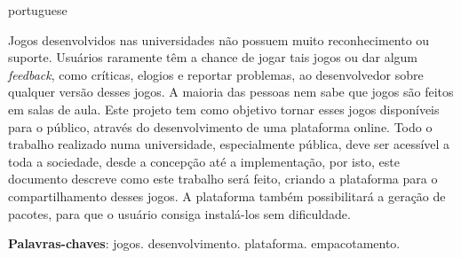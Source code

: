\begin{resumo}[Resumo]
 \begin{otherlanguage*}{portuguese}

Jogos desenvolvidos nas universidades não possuem muito reconhecimento ou suporte. Usuários raramente têm a chance de jogar tais jogos ou dar algum \textit{feedback}, como críticas, elogios e reportar problemas, ao desenvolvedor sobre qualquer versão desses jogos. A maioria das pessoas nem sabe que jogos são feitos em salas de aula. Este projeto tem como objetivo tornar esses jogos disponíveis para o público, através do desenvolvimento de uma plataforma online. Todo o trabalho realizado numa universidade, especialmente pública, deve ser acessível a toda a sociedade, desde a concepção até a implementação, por isto, este documento descreve como este trabalho será feito, criando a plataforma para o compartilhamento desses jogos. A plataforma também possibilitará a geração de pacotes, para que o usuário consiga instalá-los sem dificuldade.

 \vspace{\onelineskip}

 \noindent
 \textbf{Palavras-chaves}: jogos. desenvolvimento. plataforma. empacotamento.
 \end{otherlanguage*}
\end{resumo}
